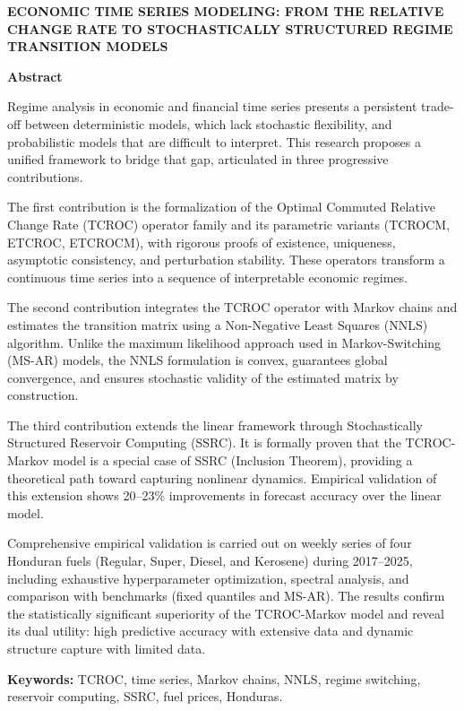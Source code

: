\let\cleardoublepage\clearpage
{}
\renewcommand{\abstractname}{Abstract}


\thispagestyle{plain}
\begin{center}
    \textbf{ECONOMIC TIME SERIES MODELING: FROM THE RELATIVE CHANGE RATE TO STOCHASTICALLY STRUCTURED REGIME TRANSITION MODELS}

        \vspace{0.9cm}
    \textbf{Abstract}
\end{center}

Regime analysis in economic and financial time series presents a persistent trade-off between deterministic models, which lack stochastic flexibility, and probabilistic models that are difficult to interpret.  This research proposes a unified framework to bridge that gap, articulated in three progressive contributions.

The first contribution is the formalization of the Optimal Commuted Relative Change Rate (TCROC) operator family and its parametric variants (TCROCM, ETCROC, ETCROCM), with rigorous proofs of existence, uniqueness, asymptotic consistency, and perturbation stability.  These operators transform a continuous time series into a sequence of interpretable economic regimes.

The second contribution integrates the TCROC operator with Markov chains and estimates the transition matrix using a Non-Negative Least Squares (NNLS) algorithm.  Unlike the maximum likelihood approach used in Markov-Switching (MS-AR) models, the NNLS formulation is convex, guarantees global convergence, and ensures stochastic validity of the estimated matrix by construction.

The third contribution extends the linear framework through Stochastically Structured Reservoir Computing (SSRC).  It is formally proven that the TCROC-Markov model is a special case of SSRC (Inclusion Theorem), providing a theoretical path toward capturing nonlinear dynamics.  Empirical validation of this extension shows 20--23\% improvements in forecast accuracy over the linear model.

Comprehensive empirical validation is carried out on weekly series of four Honduran fuels (Regular, Super, Diesel, and Kerosene) during 2017--2025, including exhaustive hyperparameter optimization, spectral analysis, and comparison with benchmarks (fixed quantiles and MS-AR).  The results confirm the statistically significant superiority of the TCROC-Markov model and reveal its dual utility: high predictive accuracy with extensive data and dynamic structure capture with limited data.

\textbf{Keywords:} TCROC, time series, Markov chains, NNLS, regime switching, reservoir computing, SSRC, fuel prices, Honduras.
